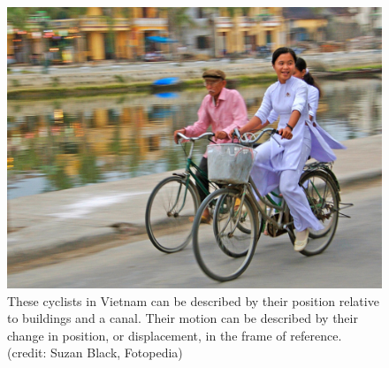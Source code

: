 \documentclass[
]{book}
\begin{document}
\begin{figure}
\hypertarget{import-auto-id2723149}{%
\centering
\includegraphics{images/Figure_02_01_00.jpg}
\caption{These cyclists in Vietnam can be described by their position relative
to buildings and a canal. Their motion can be described by their change
in position, or displacement, in the frame of reference. (credit: Suzan
Black, Fotopedia)}\label{import-auto-id2723149}
}
\end{figure}
\end{document}
